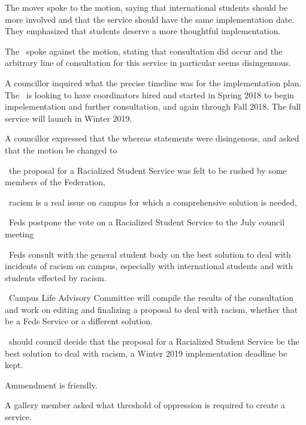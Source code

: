 \begin{motion}
\begin{motion}
        The mover spoke to the motion, saying that international students
        should be more involved and that the service should have the same
        implementation date. They emphasized that students deserve a more
        thoughtful implementation.

        The \pres\ spoke against the motion, stating that consultation did
        occur and the arbitrary line of consultation for this service in
        particular seems disingenuous.

        A councillor inquired what the precise timeline was for the 
        implementation plan. The \vpi\ is looking to have coordinators hired
        and started in Spring 2018 to begin impelementation and further
        consultation, and again through Fall 2018. The full service will launch
        in Winter 2019.

        A councillor expressed that the whereas statements were disingenous,
        and asked that the motion be changed to
        \begin{motion}
            \whereas\ the proposal for a Racialized Student Service was felt to
            be rushed by some members of the Federation,

            \whereas\ racism is a real issue on campus for which a comprehensive
            solution is needed,

            \birt\ Feds postpone the vote on a Racialized Student Service to the
            July council meeting

            \bifrt\ Feds consult with the general student body on the best solution
            to deal with incidents of racism on campus, especially with
            international students and with students effected by racism.

            \bifrt\ Campus Life Advisory Committee will compile the results of the
            consultation and work on editing and finalizing a proposal to deal with
            racism, whether that be a Feds Service or a different solution.

            \bifrt\ should council decide that the proposal for a Racialized
            Student Service be the best solution to deal with racism, a Winter 2019
            implementation deadline be kept.

            \movers{\stephanie}{\alexander}

            Ammendment is friendly.
        \end{motion}

        A gallery member asked what threshold of oppression is required to
        create a service.


\end{motion}
\end{motion}
